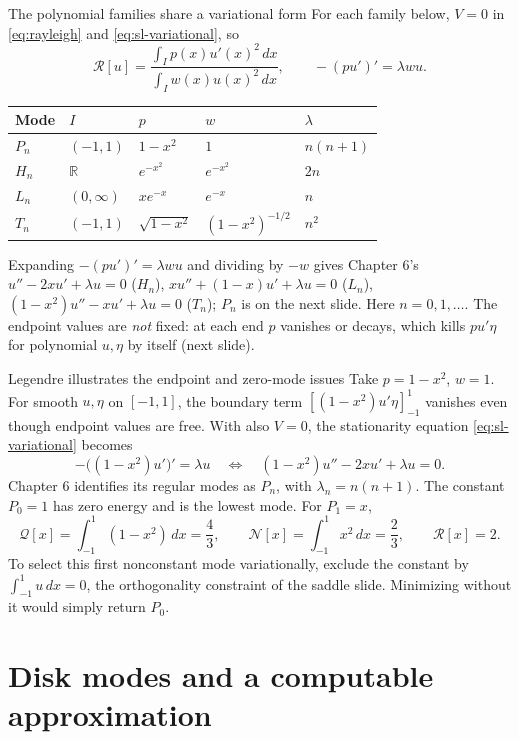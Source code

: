 \documentclass[11pt]{beamer}
\newcommand{\dd}{\,d}
\newcommand{\Q}{\mathcal Q}
\newcommand{\N}{\mathcal N}
\newcommand{\R}{\mathcal R}
\begin{document}
\begin{frame}{The polynomial families share a variational form}
\small
For each family below, $V=0$ in \eqref{eq:rayleigh} and \eqref{eq:sl-variational}, so
\[
 \R[u]=\frac{\int_Ip(x)u'(x)^2\dd x}{\int_Iw(x)u(x)^2\dd x},
 \qquad -(pu')'=\lambda wu.
\]
\begin{center}
\footnotesize
\renewcommand{\arraystretch}{1.25}
\begin{tabular}{@{}lllll@{}}
\toprule
Mode & $I$ & $p$ & $w$ & $\lambda$\\
\midrule
$P_n$ & $(-1,1)$ & $1-x^2$ & $1$ & $n(n+1)$\\
$H_n$ & $\mathbb R$ & $e^{-x^2}$ & $e^{-x^2}$ & $2n$\\
$L_n$ & $(0,\infty)$ & $xe^{-x}$ & $e^{-x}$ & $n$\\
$T_n$ & $(-1,1)$ & $\sqrt{1-x^2}$ & $(1-x^2)^{-1/2}$ & $n^2$\\
\bottomrule
\end{tabular}
\end{center}
Expanding $-(pu')'=\lambda wu$ and dividing by $-w$ gives Chapter 6's $u''-2xu'+\lambda u=0$ ($H_n$),
$xu''+(1-x)u'+\lambda u=0$ ($L_n$), $(1-x^2)u''-xu'+\lambda u=0$ ($T_n$); $P_n$ is on the next slide.
Here $n=0,1,\ldots$. The endpoint values are \emph{not} fixed: at each end $p$ vanishes
or decays, which kills $pu'\eta$ for polynomial $u,\eta$ by itself (next slide).
\end{frame}

\begin{frame}{Legendre illustrates the endpoint and zero-mode issues}
\small
Take $p=1-x^2$, $w=1$. For smooth $u,\eta$ on $[-1,1]$, the boundary term
$[(1-x^2)u'\eta]_{-1}^1$ vanishes even though endpoint values are free.
With also $V=0$, the stationarity equation \eqref{eq:sl-variational} becomes
\[
 -\bigl((1-x^2)u'\bigr)'=\lambda u
 \quad\Longleftrightarrow\quad
 (1-x^2)u''-2xu'+\lambda u=0.
\]
Chapter 6 identifies its regular modes as $P_n$, with $\lambda_n=n(n+1)$.
The constant $P_0=1$ has zero energy and is the lowest mode.
For $P_1=x$,
\[
 \Q[x]=\int_{-1}^1(1-x^2)\dd x=\frac43,
 \qquad \N[x]=\int_{-1}^1x^2\dd x=\frac23,
 \qquad \R[x]=2.
\]
To select this first nonconstant mode variationally, exclude the constant by
$\int_{-1}^1u\dd x=0$, the orthogonality constraint of the saddle slide.
Minimizing without it would simply return $P_0$.
\end{frame}

\section{Disk modes and a computable approximation}
\end{document}
